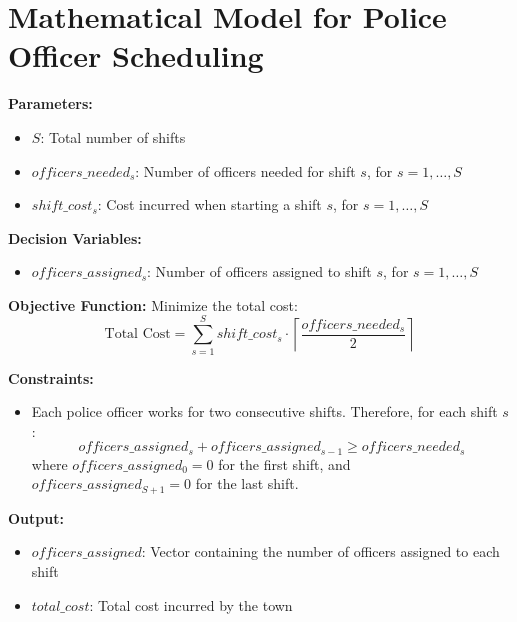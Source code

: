 \documentclass{article}
\begin{document}
\section*{Mathematical Model for Police Officer Scheduling}

\textbf{Parameters:}
\begin{itemize}
    \item $S$: Total number of shifts
    \item $officers\_needed_{s}$: Number of officers needed for shift $s$, for $s = 1, \ldots, S$
    \item $shift\_cost_{s}$: Cost incurred when starting a shift $s$, for $s = 1, \ldots, S$
\end{itemize}

\textbf{Decision Variables:}
\begin{itemize}
    \item $officers\_assigned_{s}$: Number of officers assigned to shift $s$, for $s = 1, \ldots, S$
\end{itemize}

\textbf{Objective Function:}
Minimize the total cost:
\[
\text{Total Cost} = \sum_{s=1}^{S} shift\_cost_{s} \cdot \left\lceil \frac{officers\_needed_{s}}{2} \right\rceil
\]

\textbf{Constraints:}
\begin{itemize}
    \item Each police officer works for two consecutive shifts. Therefore, for each shift $s$:
    \[
    officers\_assigned_{s} + officers\_assigned_{s-1} \geq officers\_needed_{s}
    \]
    where $officers\_assigned_{0} = 0$ for the first shift, and $officers\_assigned_{S+1} = 0$ for the last shift.
\end{itemize}

\textbf{Output:}
\begin{itemize}
    \item $officers\_assigned$: Vector containing the number of officers assigned to each shift
    \item $total\_cost$: Total cost incurred by the town
\end{itemize}
\end{document}
